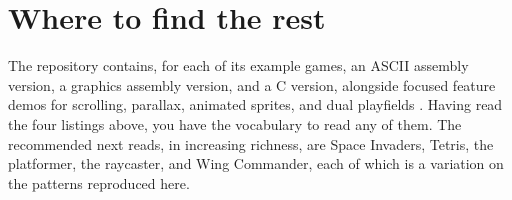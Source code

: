 

\section{Where to find the rest}

The  repository contains, for each of its example games, an ASCII assembly
version, a graphics assembly version, and a C version, alongside focused feature
demos for scrolling, parallax, animated sprites, and dual playfields
\citep{prg32repo}. Having read the four listings above, you have the vocabulary to
read any of them. The recommended next reads, in increasing richness, are Space
Invaders, Tetris, the platformer, the raycaster, and Wing Commander, each of which
is a variation on the patterns reproduced here.
